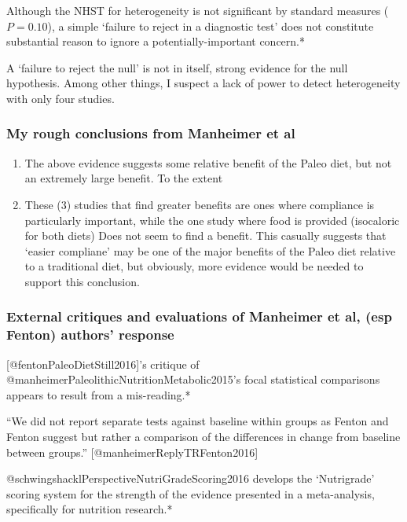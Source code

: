 \documentclass[]{article}
\begin{document}
Although the NHST for heterogeneity is not significant by standard
measures (\(P=0.10\)), a simple `failure to reject in a diagnostic test'
does not constitute substantial reason to ignore a potentially-important
concern.*

A `failure to reject the null' is not in itself, strong evidence for the
null hypothesis. Among other things, I suspect a lack of power to detect
heterogeneity with only four studies.

\hypertarget{my-rough-conclusions-from-manheimer-et-al}{%
\subsubsection{My rough conclusions from Manheimer et
al}\label{my-rough-conclusions-from-manheimer-et-al}}

\begin{enumerate}
\def\labelenumi{\arabic{enumi}.}
\item
  The above evidence suggests some relative benefit of the Paleo diet,
  but not an extremely large benefit. To the extent
\item
  These (3) studies that find greater benefits are ones where compliance
  is particularly important, while the one study where food is provided
  (isocaloric for both diets) Does not seem to find a benefit. This
  casually suggests that `easier compliane' may be one of the major
  benefits of the Paleo diet relative to a traditional diet, but
  obviously, more evidence would be needed to support this conclusion.
\end{enumerate}

\hypertarget{critiques}{%
\subsubsection{External critiques and evaluations of Manheimer et al,
(esp Fenton) authors' response}\label{critiques}}

{[}@fentonPaleoDietStill2016{]}'s critique of
@manheimerPaleolithicNutritionMetabolic2015's focal statistical
comparisons appears to result from a mis-reading.*

``We did not report separate tests against baseline within groups as
Fenton and Fenton suggest but rather a comparison of the differences in
change from baseline between groups.'' {[}@manheimerReplyTRFenton2016{]}

@schwingshacklPerspectiveNutriGradeScoring2016 develops the `Nutrigrade'
scoring system for the strength of the evidence presented in a
meta-analysis, specifically for nutrition research.*
\end{document}
